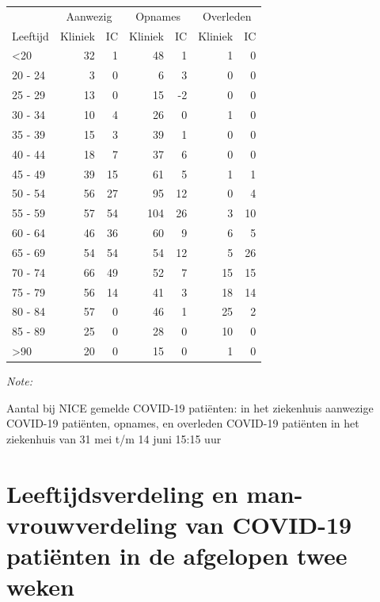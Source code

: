 \documentclass[
  english,
  man,floatsintext]{apa6}
\begin{document}
\begin{table}
\centering\begingroup\fontsize{10}{12}\selectfont

\begin{threeparttable}
\begin{tabular}{lrrrrrr}
\toprule
\multicolumn{1}{c}{ } & \multicolumn{2}{c}{Aanwezig} & \multicolumn{2}{c}{Opnames} & \multicolumn{2}{c}{Overleden} \\
\cmidrule(l{3pt}r{3pt}){2-3} \cmidrule(l{3pt}r{3pt}){4-5} \cmidrule(l{3pt}r{3pt}){6-7}
Leeftijd & Kliniek & IC & Kliniek & IC & Kliniek & IC\\
\midrule
<20 & 32 & 1 & 48 & 1 & 1 & 0\\
20 - 24 & 3 & 0 & 6 & 3 & 0 & 0\\
25 - 29 & 13 & 0 & 15 & -2 & 0 & 0\\
30 - 34 & 10 & 4 & 26 & 0 & 1 & 0\\
35 - 39 & 15 & 3 & 39 & 1 & 0 & 0\\
40 - 44 & 18 & 7 & 37 & 6 & 0 & 0\\
45 - 49 & 39 & 15 & 61 & 5 & 1 & 1\\
50 - 54 & 56 & 27 & 95 & 12 & 0 & 4\\
55 - 59 & 57 & 54 & 104 & 26 & 3 & 10\\
60 - 64 & 46 & 36 & 60 & 9 & 6 & 5\\
65 - 69 & 54 & 54 & 54 & 12 & 5 & 26\\
70 - 74 & 66 & 49 & 52 & 7 & 15 & 15\\
75 - 79 & 56 & 14 & 41 & 3 & 18 & 14\\
80 - 84 & 57 & 0 & 46 & 1 & 25 & 2\\
85 - 89 & 25 & 0 & 28 & 0 & 10 & 0\\
>90 & 20 & 0 & 15 & 0 & 1 & 0\\
\bottomrule
\end{tabular}
\begin{tablenotes}
\item \textit{Note: } 
\item Aantal bij NICE gemelde COVID-19 patiënten: in het ziekenhuis aanwezige COVID-19 patiënten, opnames, en overleden COVID-19 patiënten in het ziekenhuis van 31 mei t/m 14 juni 15:15 uur
\end{tablenotes}
\end{threeparttable}
\endgroup{}
\end{table}

\newpage

\hypertarget{leeftijdsverdeling-en-man-vrouwverdeling-van-covid-19-patiuxebnten-in-de-afgelopen-twee-weken}{%
\section{Leeftijdsverdeling en man-vrouwverdeling van COVID-19 patiënten in de afgelopen twee weken}\label{leeftijdsverdeling-en-man-vrouwverdeling-van-covid-19-patiuxebnten-in-de-afgelopen-twee-weken}}
\end{document}
